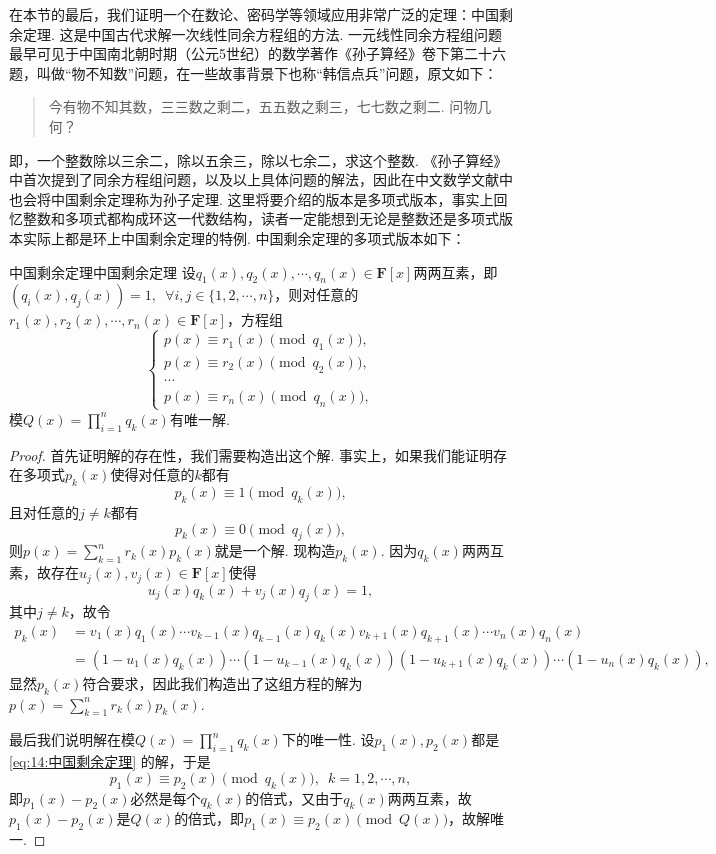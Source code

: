 在本节的最后，我们证明一个在数论、密码学等领域应用非常广泛的定理：中国剩余定理. 这是中国古代求解一次线性同余方程组的方法. 一元线性同余方程组问题最早可见于中国南北朝时期（公元5世纪）的数学著作《孙子算经》卷下第二十六题，叫做``物不知数''问题，在一些故事背景下也称``韩信点兵''问题，原文如下：
\begin{quotation}
    \kaishu
    今有物不知其数，三三数之剩二，五五数之剩三，七七数之剩二. 问物几何？
\end{quotation}
即，一个整数除以三余二，除以五余三，除以七余二，求这个整数. 《孙子算经》中首次提到了同余方程组问题，以及以上具体问题的解法，因此在中文数学文献中也会将中国剩余定理称为孙子定理. 这里将要介绍的版本是多项式版本，事实上回忆整数和多项式都构成环这一代数结构，读者一定能想到无论是整数还是多项式版本实际上都是环上中国剩余定理的特例. 中国剩余定理的多项式版本如下：
\begin{theorem}{中国剩余定理}{中国剩余定理}
    设$q_1(x),q_2(x),\cdots,q_n(x)\in\mathbf{F}[x]$两两互素，即$(q_i(x),q_j(x))=1,\enspace\forall i,j\in\{1,2,\cdots,n\}$，则对任意的$r_1(x),r_2(x),\cdots,r_n(x)\in\mathbf{F}[x]$，方程组
    \begin{equation} \label{eq:14:中国剩余定理}
        \begin{cases}
            p(x)\equiv r_1(x)\pmod{q_1(x)}, \\
            p(x)\equiv r_2(x)\pmod{q_2(x)}, \\
            \cdots                          \\
            p(x)\equiv r_n(x)\pmod{q_n(x)},
        \end{cases}
    \end{equation}
    模$Q(x)=\prod\limits_{i=1}^nq_k(x)$有唯一解.
\end{theorem}
\begin{proof}
    首先证明解的存在性，我们需要构造出这个解. 事实上，如果我们能证明存在多项式$p_k(x)$使得对任意的$k$都有
    \[p_k(x)\equiv 1\pmod{q_k(x)},\]
    且对任意的$j\neq k$都有
    \[p_k(x)\equiv 0\pmod{q_j(x)},\]
    则$p(x)=\sum\limits_{k=1}^nr_k(x)p_k(x)$就是一个解. 现构造$p_k(x)$. 因为$q_k(x)$两两互素，故存在$u_j(x),v_j(x)\in\mathbf{F}[x]$使得
    \[u_j(x)q_k(x)+v_j(x)q_j(x)=1,\]
    其中$j\neq k$，故令
    \begin{align*}
        p_k(x) & =v_1(x)q_1(x)\cdots v_{k-1}(x)q_{k-1}(x)q_k(x)v_{k+1}(x)q_{k+1}(x)\cdots v_n(x)q_n(x)  \\
               & =(1-u_1(x)q_k(x))\cdots(1-u_{k-1}(x)q_k(x))(1-u_{k+1}(x)q_k(x))\cdots(1-u_n(x)q_k(x)),
    \end{align*}
    显然$p_k(x)$符合要求，因此我们构造出了这组方程的解为$p(x)=\sum\limits_{k=1}^nr_k(x)p_k(x)$.

    最后我们说明解在模$Q(x)=\prod\limits_{i=1}^nq_k(x)$下的唯一性. 设$p_1(x),p_2(x)$都是\autoref{eq:14:中国剩余定理} 的解，于是
    \[p_1(x)\equiv p_2(x)\pmod{q_k(x)},\enspace k=1,2,\cdots,n,\]
    即$p_1(x)-p_2(x)$必然是每个$q_k(x)$的倍式，又由于$q_k(x)$两两互素，故$p_1(x)-p_2(x)$是$Q(x)$的倍式，即$p_1(x)\equiv p_2(x)\pmod{Q(x)}$，故解唯一.
\end{proof}

